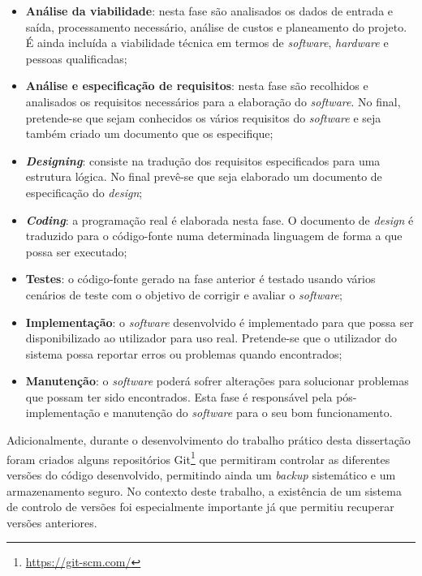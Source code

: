 \begin{itemize}
	\item \textbf{Análise da viabilidade}: nesta fase são analisados os dados de entrada e saída, processamento necessário, análise de custos e planeamento do projeto. É ainda incluída a viabilidade técnica em termos de \textit{software}, \textit{hardware} e pessoas qualificadas;
	
	\item \textbf{Análise e especificação de requisitos}: nesta fase são recolhidos e analisados os requisitos necessários para a elaboração do \textit{software}. No final, pretende-se que sejam conhecidos os vários requisitos do \textit{software} e seja também criado um documento que os especifique; 
	
	\item  \textbf{\textit{Designing}}: consiste na tradução dos requisitos especificados para uma estrutura lógica. No final prevê-se que seja elaborado um documento de especificação do \textit{design}; 
	
	
	\item  \textbf{\textit{Coding}}: a programação real é elaborada nesta fase. O documento de \textit{design} é traduzido para o código-fonte numa determinada linguagem de forma a que possa ser executado;
	
	\item \textbf{Testes}: o código-fonte gerado na fase anterior é testado usando vários cenários de teste com o objetivo de corrigir e avaliar o \textit{software}; 
	
	\item  \textbf{Implementação}: o \textit{software} desenvolvido é implementado para que possa ser disponibilizado ao utilizador para uso real. Pretende-se que o utilizador do sistema possa reportar erros ou problemas quando encontrados; 
	
	\item  \textbf{Manutenção}: o \textit{software} poderá sofrer alterações para solucionar problemas que possam ter sido encontrados. Esta fase é responsável pela pós-implementação e manutenção do \textit{software} para o seu bom funcionamento.
	
\end{itemize}


Adicionalmente, durante o desenvolvimento do trabalho prático desta dissertação foram criados alguns repositórios Git\footnote{\url{https://git-scm.com/}} que permitiram controlar as diferentes versões do código desenvolvido, permitindo ainda um \textit{backup} sistemático e um armazenamento seguro. No contexto deste trabalho, a existência de um sistema de controlo de versões foi especialmente importante já que permitiu recuperar versões anteriores. 








